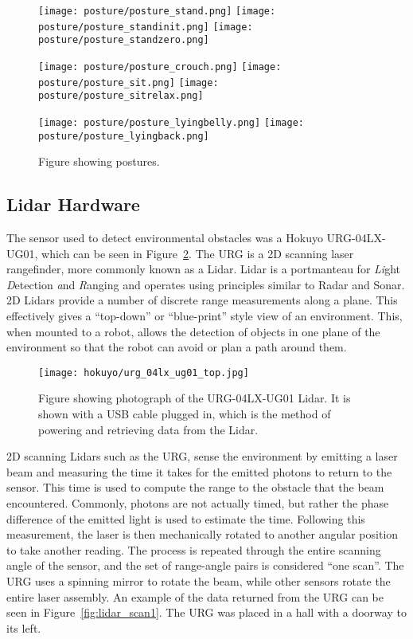 \begin{figure}
\centerline{\texttt{[image: posture/posture\_stand.png]}
            \texttt{[image: posture/posture\_standinit.png]}
            \texttt{[image: posture/posture\_standzero.png]}
}
\vspace*{0.05in}
\centerline{\texttt{[image: posture/posture\_crouch.png]}
            \texttt{[image: posture/posture\_sit.png]}
            \texttt{[image: posture/posture\_sitrelax.png]}
}
\vspace*{0.05in}
\centerline{\texttt{[image: posture/posture\_lyingbelly.png]}
            \texttt{[image: posture/posture\_lyingback.png]}
}
\caption{Figure showing postures.}
\label{fig:nao_postures1}
\end{figure}


\clearpage

\subsection{Lidar Hardware}
The sensor used to detect environmental obstacles was a Hokuyo
URG-04LX-UG01, which can be seen in Figure~\ref{fig:lidar_top1}. 
The URG is a 2D scanning laser rangefinder, more commonly known as
a Lidar. Lidar is a portmanteau for \textit{Li}ght \textit{D}etection 
\textit{a}nd \textit{R}anging and operates using principles similar 
to Radar and Sonar. 2D Lidars provide a number of discrete range measurements
along a plane. This effectively gives a ``top-down'' or ``blue-print''
style view of an environment.
This, when mounted to a robot, allows the detection of objects in one plane of
the environment so that the robot can avoid or plan a path around them.

\begin{figure}
\centering
\texttt{[image: hokuyo/urg\_04lx\_ug01\_top.jpg]}
\caption{Figure showing photograph of the URG-04LX-UG01 Lidar. It is shown
         with a USB cable plugged in, which is the method of powering
         and retrieving data from the Lidar.}
\label{fig:lidar_top1}
\end{figure}

2D scanning Lidars such as the URG, sense the environment by emitting a laser
beam and measuring the time it takes for the emitted photons to return to the sensor.
This time is used to compute the range to the obstacle that the beam encountered.
Commonly, photons are not actually timed, but rather the phase difference of the
emitted light is used to estimate the time.
Following this measurement, the laser is then mechanically rotated to another 
angular position to take another reading. The process is repeated through the 
entire scanning angle of the sensor, and the set of range-angle pairs is 
considered ``one scan''. The URG uses a spinning mirror to rotate the beam, while
other sensors rotate the entire laser assembly.
An example of the data returned from the URG can be seen in Figure~\ref{fig:lidar_scan1}.
The URG was placed in a hall with a doorway to its left.

